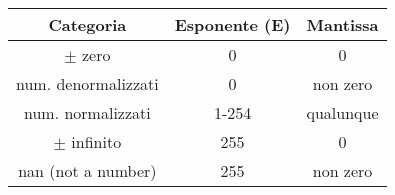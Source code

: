 \documentclass{standalone}
\begin{document}
\begin{tabular}{ ccc }
	\toprule
		Categoria & Esponente (E) & Mantissa\\
	\midrule
		\(\pm\) zero & 0 & 0 \\\hline
		num. denormalizzati & 0 & non zero\\\hline
		num. normalizzati & 1-254 & qualunque\\\hline
		\(\pm\) infinito & 255 & 0\\\hline
		nan (not a number) & 255 & non zero\\
	\bottomrule
\end{tabular}
\end{document}
